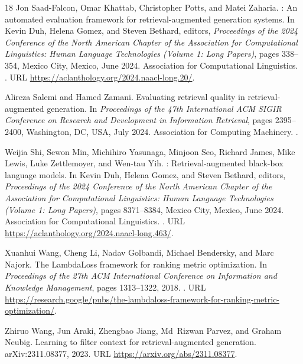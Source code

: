 \begin{thebibliography}{18}
Jon Saad-Falcon, Omar Khattab, Christopher Potts, and Matei Zaharia.
: An automated evaluation framework for retrieval-augmented
  generation systems.
\newblock In Kevin Duh, Helena Gomez, and Steven Bethard, editors,
  \emph{Proceedings of the 2024 Conference of the North American Chapter of the
  Association for Computational Linguistics: Human Language Technologies
  (Volume 1: Long Papers)}, pages 338--354, Mexico City, Mexico, June 2024.
  Association for Computational Linguistics.
\newblock {}.
\newblock URL \url{https://aclanthology.org/2024.naacl-long.20/}.

Alireza Salemi and Hamed Zamani.
\newblock Evaluating retrieval quality in retrieval-augmented generation.
\newblock In \emph{Proceedings of the 47th International ACM SIGIR Conference
  on Research and Development in Information Retrieval}, pages 2395--2400,
  Washington, DC, USA, July 2024. Association for Computing Machinery.
\newblock {}.

Weijia Shi, Sewon Min, Michihiro Yasunaga, Minjoon Seo, Richard James, Mike
  Lewis, Luke Zettlemoyer, and Wen-tau Yih.
: Retrieval-augmented black-box language models.
\newblock In Kevin Duh, Helena Gomez, and Steven Bethard, editors,
  \emph{Proceedings of the 2024 Conference of the North American Chapter of the
  Association for Computational Linguistics: Human Language Technologies
  (Volume 1: Long Papers)}, pages 8371--8384, Mexico City, Mexico, June 2024.
  Association for Computational Linguistics.
\newblock {}.
\newblock URL \url{https://aclanthology.org/2024.naacl-long.463/}.

Xuanhui Wang, Cheng Li, Nadav Golbandi, Michael Bendersky, and Marc Najork.
\newblock The LambdaLoss framework for ranking metric optimization.
\newblock In \emph{Proceedings of the 27th ACM International Conference on Information and Knowledge Management}, pages 1313--1322, 2018.
\newblock {}.
\newblock URL \url{https://research.google/pubs/the-lambdaloss-framework-for-ranking-metric-optimization/}.

Zhiruo Wang, Jun Araki, Zhengbao Jiang, Md~Rizwan Parvez, and Graham Neubig.
\newblock Learning to filter context for retrieval-augmented generation.
\newblock arXiv:2311.08377, 2023.
\newblock URL \url{https://arxiv.org/abs/2311.08377}.


\end{thebibliography}
